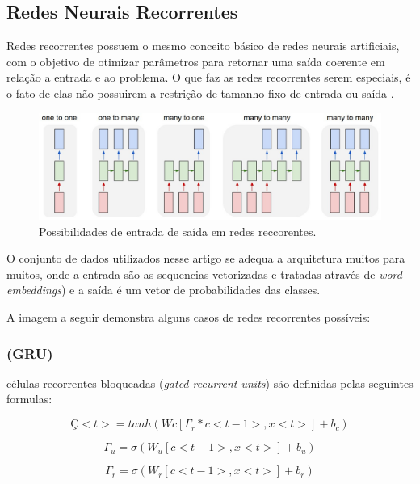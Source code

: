 \documentclass[12pt]{article}
\begin{document}
\subsection{Redes Neurais Recorrentes}

Redes recorrentes possuem o mesmo conceito básico de redes neurais artificiais, com o objetivo de otimizar parâmetros para retornar uma saída coerente em relação a entrada e ao problema. O que faz as redes recorrentes serem especiais, é o fato de elas não possuirem a restrição de tamanho fixo de entrada ou saída \cite{karpathy:2015}.

\begin{figure}[ht]
\centering
\includegraphics[width=1\textwidth]{images/rnn-effectiveness-examples.jpeg}
\caption{
    Possibilidades de entrada de saída em redes reccorentes. \cite{karpathy:2015}
}
\label{fig:sigmoid}
\end{figure}

O conjunto de dados utilizados nesse artigo se adequa a arquitetura muitos para muitos, onde a entrada são as sequencias vetorizadas e tratadas através de \textit{word embeddings}) e a saída é um vetor de probabilidades das classes.

A imagem a seguir demonstra alguns casos de redes recorrentes possíveis:

\subsubsection{(GRU)}
células recorrentes bloqueadas (\textit{gated recurrent units}) são definidas pelas seguintes formulas:

\begin{equation}
    Ç<t> = tanh(Wc[\Gamma_r * c<t-1>, x<t>]+b_c)
\end{equation}

\begin{equation}
    \Gamma_u = \sigma(W_u[c<t-1>, x<t>]+b_u)
\end{equation}

\begin{equation}
    \Gamma_r = \sigma(W_r[c<t-1>, x<t>]+b_r)
\end{equation}
\end{document}
